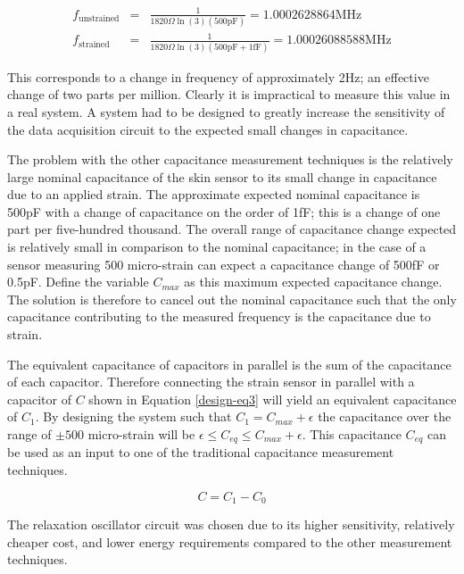 \begin{eqnarray}
	f_{\text{unstrained}}&=&\frac{1}{1820\Omega\ln(3)(500\text{pF})}=1.0002628864 \text{MHz}\label{design-eq1}\\
	f_{\text{strained}}&=&\frac{1}{1820\Omega\ln(3)(500\text{pF}+1\text{fF})}=1.00026088588 \text{MHz}\label{design-eq2}
\end{eqnarray}

This corresponds to a change in frequency of approximately 2Hz; an effective change of two parts per million.  Clearly it is impractical to measure this value in a real system.  A system had to be designed to greatly increase the sensitivity of the data acquisition circuit to the expected small changes in capacitance.

The problem with the other capacitance measurement techniques is the relatively large nominal capacitance of the skin sensor to its small change in capacitance due to an applied strain.  The approximate expected nominal capacitance is 500pF with a change of capacitance on the order of 1fF; this is a change of one part per five-hundred thousand.  The overall range of capacitance change expected is relatively small in comparison to the nominal capacitance; in the case of a sensor measuring 500 micro-strain can expect a capacitance change of 500fF or 0.5pF.  Define the variable $C_{max}$ as this maximum expected capacitance change.  The solution is therefore to cancel out the nominal capacitance such that the only capacitance contributing to the measured frequency is the capacitance due to strain.

The equivalent capacitance of capacitors in parallel is the sum of the capacitance of each capacitor.  Therefore connecting the strain sensor in parallel with a capacitor of $C$ shown in Equation \ref{design-eq3} will yield an equivalent capacitance of $C_1$.  By designing the system such that $C_1=C_{max}+\epsilon$ the capacitance over the range of $\pm500$ micro-strain will be $\epsilon\leq C_{eq} \leq C_{max}+\epsilon$.  This capacitance $C_{eq}$ can be used as an input to one of the traditional capacitance measurement techniques.

\begin{equation}
	C=C_1-C_0\label{design-eq3}
\end{equation} 

The relaxation oscillator circuit was chosen due to its higher sensitivity, relatively cheaper cost, and lower energy requirements compared to the other measurement techniques.

